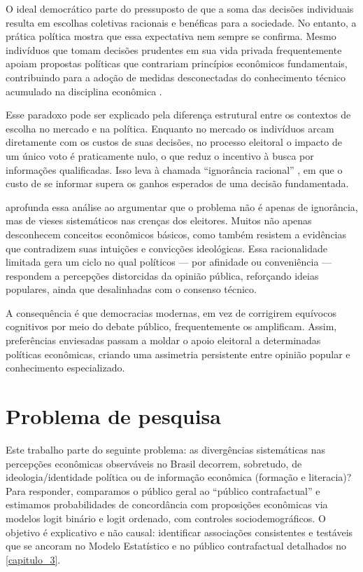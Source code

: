 O ideal democrático parte do pressuposto de que a soma das decisões individuais resulta em escolhas coletivas racionais e benéficas para a sociedade. No entanto, a prática política mostra que essa expectativa nem sempre se confirma. Mesmo indivíduos que tomam decisões prudentes em sua vida privada frequentemente apoiam propostas políticas que contrariam princípios econômicos fundamentais, contribuindo para a adoção de medidas desconectadas do conhecimento técnico acumulado na disciplina econômica \cite{The_Myth_of_the_Rational_Voter,downs1957economic}.

Esse paradoxo pode ser explicado pela diferença estrutural entre os contextos de escolha no mercado e na política. Enquanto no mercado os indivíduos arcam diretamente com os custos de suas decisões, no processo eleitoral o impacto de um único voto é praticamente nulo, o que reduz o incentivo à busca por informações qualificadas. Isso leva à chamada “ignorância racional” \cite{downs1957economic}, em que o custo de se informar supera os ganhos esperados de uma decisão fundamentada.

 aprofunda essa análise ao argumentar que o problema não é apenas de ignorância, mas de vieses sistemáticos nas crenças dos eleitores. Muitos não apenas desconhecem conceitos econômicos básicos, como também resistem a evidências que contradizem suas intuições e convicções ideológicas. Essa racionalidade limitada gera um ciclo no qual políticos — por afinidade ou conveniência — respondem a percepções distorcidas da opinião pública, reforçando ideias populares, ainda que desalinhadas com o consenso técnico.

A consequência é que democracias modernas, em vez de corrigirem equívocos cognitivos por meio do debate público, frequentemente os amplificam. Assim, preferências enviesadas passam a moldar o apoio eleitoral a determinadas políticas econômicas, criando uma assimetria persistente entre opinião popular e conhecimento especializado.

\section{Problema de pesquisa}
Este trabalho parte do seguinte problema: as divergências sistemáticas nas percepções econômicas observáveis no Brasil decorrem, sobretudo, de ideologia/identidade política ou de informação econômica (formação e literacia)? Para responder, comparamos o público geral ao “público contrafactual” e estimamos probabilidades de concordância com proposições econômicas via modelos logit binário e logit ordenado, com controles sociodemográficos. O objetivo é explicativo e não causal: identificar associações consistentes e testáveis que se ancoram no Modelo Estatístico e no público contrafactual detalhados no \autoref{capitulo_3}.


